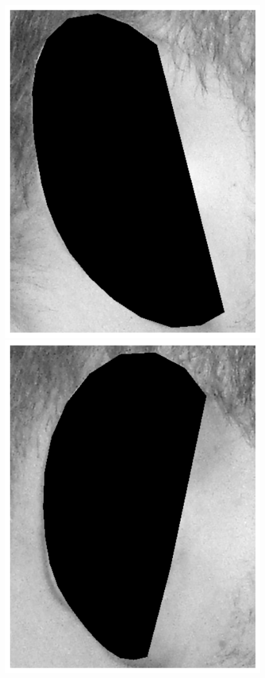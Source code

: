 \begin{figure}
    \includegraphics[height=\flowhh]{resources/Ear_Deformable_Model/verification/background_exp/ear_bg_1}
    \hfill
    \includegraphics[height=\flowhh]{resources/Ear_Deformable_Model/verification/background_exp/ear_bg_2}

\end{figure}
